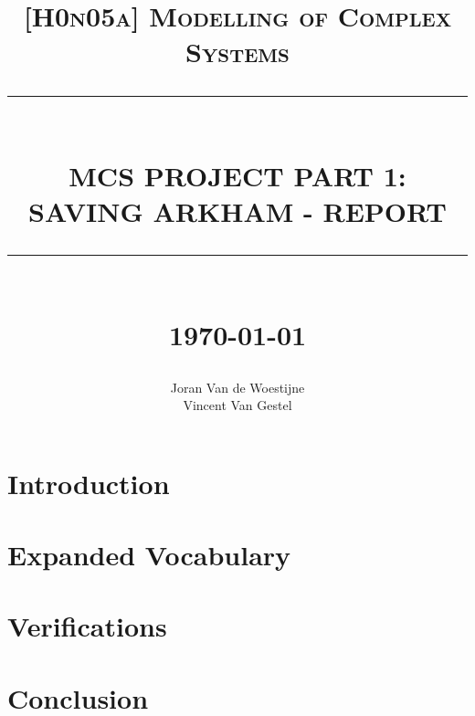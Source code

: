 \documentclass[12pt]{report}
\newcommand{\HRule}[1]{\rule{\linewidth}{#1}}
\begin{document}
\title{ \normalsize \textsc{[H0n05a] Modelling of Complex Systems}
		\\ [2.0cm]
		\HRule{0.5pt} \\
		\LARGE \textbf{\uppercase{MCS Project Part 1: Saving Arkham - Report}}
		\HRule{2pt} \\ [0.5cm]
		\normalsize \today \vspace*{5\baselineskip}}

\date{}

\author{
		Joran Van de Woestijne \\
                Vincent Van Gestel}

\maketitle
\newpage

\sectionfont{\scshape}

\section*{Introduction}

\section*{Expanded Vocabulary}

\section*{Verifications}

\section*{Conclusion}
\end{document}
